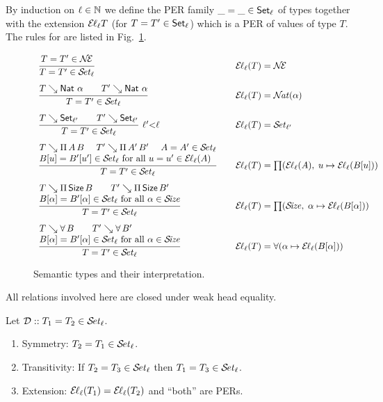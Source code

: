\documentclass[acmsmall,screen]{acmart}\settopmatter{}
\newcommand{\LONGVERSION}[1]{}
\begin{document}
By induction on $\ell \in \NN$ we define the PER family
$\_ = \_ \in \Set[\ell]$ of types
together with the extension $\EL[\ell] T$ (for $T = T' \in \Set[\ell]$)
which is a PER of values of type $T$.
The rules for  are listed in Fig.~\ref{fig:per}.
\begin{figure}
\hrulefill
\[
\begin{array}{l@{\qquad}l}
  \ru{%
      T = T' \in \NEE
    }{T = T' \in \SET[\ell]}
  & \EL[\ell](T) = \NEE
\\[3ex]
  \ru{T \evalsto \Nat\,\alpha \qquad T' \evalsto \Nat\,\alpha
    }{T = T' \in \SET[\ell]}
  & \EL[\ell](T) = \NAT(\alpha)
\\[3ex]
  \rux{T \evalsto \Set[\ell'] \qquad T' \evalsto \Set[\ell']
     }{T = T' \in \SET[\ell]
     }{\ell'{<}\ell}
  & \EL[\ell](T) = \SET[\ell']
\\[3ex]
  \rul{T \evalsto \piT A B \quad \
      T' \evalsto \piT{A'}{B'} \quad \
      A = A' \in \SET[\ell] \\
      B[u] = B'[u'] \in \SET[\ell] \mforall u = u' \in \EL[\ell](A)
    }{T = T' \in \SET[\ell]}
  & \EL[\ell](T) = \PI(\EL[\ell](A),\;u \mapsto \EL[\ell](B[u]))
\\[3ex]
  \rul{T \evalsto \piT \Size B \qquad
      T' \evalsto \piT{\Size}{B'} \\
      B[\alpha] = B'[\alpha] \in \SET[\ell] \mforall \alpha \in \SIZE
    }{T = T' \in \SET[\ell]}
  & \EL[\ell](T) = \PI(\SIZE,\; \alpha \mapsto \EL[\ell](B[\alpha]))
\\[3ex]
  \rul{T \evalsto \forallT B \qquad
      T' \evalsto \forallT{B'} \\
      B[\alpha] = B'[\alpha] \in \SET[\ell] \mforall \alpha \in \SIZE
    }{T = T' \in \SET[\ell]}
  & \EL[\ell](T) = \FORALL(\alpha \mapsto \EL[\ell](B[\alpha]))
\end{array}
\]
\hrulefill
\caption{Semantic types and their interpretation.\label{fig:per}}
\end{figure}
All relations involved here are closed under weak head equality.
\begin{lemma}[Well-definedness]
  Let $\DD :: T_1 = T_2 \in \SET[\ell]$.
  \begin{enumerate}
  \item Symmetry: $T_2 = T_1 \in \SET[\ell]$.
  \item Transitivity: If\/ $T_2 = T_3 \in \SET[\ell]$ then $T_1 = T_3 \in \SET[\ell]$.
  \item Extension: $\EL[\ell](T_1) = \EL[\ell](T_2)$ and ``both'' are PERs.
  \end{enumerate}
\end{lemma}
\LONGVERSION{
\begin{proof}
  Simultaneously by induction on $\DD$.
\end{proof}
}
\end{document}
